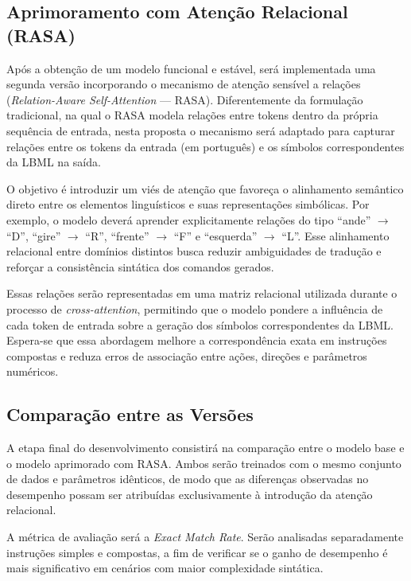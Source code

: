 \documentclass[12pt]{article}
\begin{document}
\subsection{Aprimoramento com Atenção Relacional (RASA)}

Após a obtenção de um modelo funcional e estável, será implementada uma segunda versão incorporando o mecanismo de atenção sensível a relações (\textit{Relation-Aware Self-Attention} — RASA). Diferentemente da formulação tradicional, na qual o RASA modela relações entre tokens dentro da própria sequência de entrada, nesta proposta o mecanismo será adaptado para capturar relações entre os tokens da entrada (em português) e os símbolos correspondentes da LBML na saída.

O objetivo é introduzir um viés de atenção que favoreça o alinhamento semântico direto entre os elementos linguísticos e suas representações simbólicas. Por exemplo, o modelo deverá aprender explicitamente relações do tipo “ande” $\rightarrow$ “D”, “gire” $\rightarrow$ “R”, “frente” $\rightarrow$ “F” e “esquerda” $\rightarrow$ “L”. Esse alinhamento relacional entre domínios distintos busca reduzir ambiguidades de tradução e reforçar a consistência sintática dos comandos gerados.

Essas relações serão representadas em uma matriz relacional utilizada durante o processo de \textit{cross-attention}, permitindo que o modelo pondere a influência de cada token de entrada sobre a geração dos símbolos correspondentes da LBML. Espera-se que essa abordagem melhore a correspondência exata em instruções compostas e reduza erros de associação entre ações, direções e parâmetros numéricos.

\subsection{Comparação entre as Versões}

A etapa final do desenvolvimento consistirá na comparação entre o modelo base e o modelo aprimorado com RASA. Ambos serão treinados com o mesmo conjunto de dados e parâmetros idênticos, de modo que as diferenças observadas no desempenho possam ser atribuídas exclusivamente à introdução da atenção relacional.

A métrica de avaliação será a \textit{Exact Match Rate}. Serão analisadas separadamente instruções simples e compostas, a fim de verificar se o ganho de desempenho é mais significativo em cenários com maior complexidade sintática.



\end{document}
